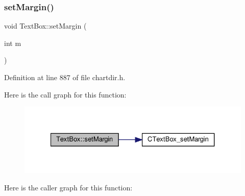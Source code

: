 \subsubsection{\texorpdfstring{set\+Margin()}{setMargin()}\hspace{0.1cm}{\footnotesize\ttfamily [1/2]}}
{\footnotesize\ttfamily void Text\+Box\+::set\+Margin (\begin{DoxyParamCaption}\item[{int}]{m }\end{DoxyParamCaption})\hspace{0.3cm}{\ttfamily [inline]}}



Definition at line 887 of file chartdir.\+h.

Here is the call graph for this function\+:
\nopagebreak
\begin{figure}[H]
\begin{center}
\leavevmode
\includegraphics[width=327pt]{class_text_box_aaadf6bbde148a221869df43c11a0d623_cgraph}
\end{center}
\end{figure}
Here is the caller graph for this function\+:
\nopagebreak
